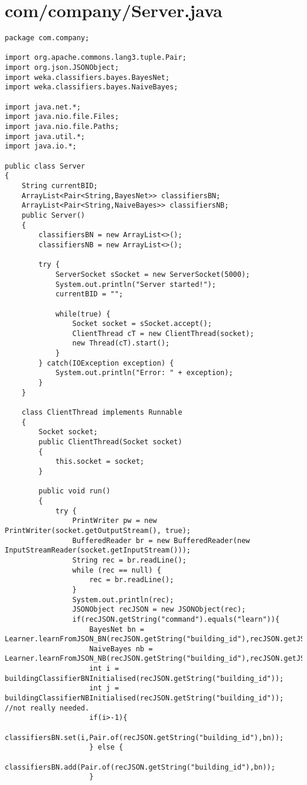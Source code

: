 \documentclass{article}
\begin{document}
\section{com/company/Server.java}
\begin{lstlisting}package com.company;

import org.apache.commons.lang3.tuple.Pair;
import org.json.JSONObject;
import weka.classifiers.bayes.BayesNet;
import weka.classifiers.bayes.NaiveBayes;

import java.net.*;
import java.nio.file.Files;
import java.nio.file.Paths;
import java.util.*;
import java.io.*;

public class Server
{
    String currentBID;
    ArrayList<Pair<String,BayesNet>> classifiersBN;
    ArrayList<Pair<String,NaiveBayes>> classifiersNB;
    public Server()
    {
        classifiersBN = new ArrayList<>();
        classifiersNB = new ArrayList<>();

        try {
            ServerSocket sSocket = new ServerSocket(5000);
            System.out.println("Server started!");
            currentBID = "";

            while(true) {
                Socket socket = sSocket.accept();
                ClientThread cT = new ClientThread(socket);
                new Thread(cT).start();
            }
        } catch(IOException exception) {
            System.out.println("Error: " + exception);
        }
    }

    class ClientThread implements Runnable
    {
        Socket socket;
        public ClientThread(Socket socket)
        {
            this.socket = socket;
        }

        public void run()
        {
            try {
                PrintWriter pw = new PrintWriter(socket.getOutputStream(), true);
                BufferedReader br = new BufferedReader(new InputStreamReader(socket.getInputStream()));
                String rec = br.readLine();
                while (rec == null) {
                    rec = br.readLine();
                }
                System.out.println(rec);
                JSONObject recJSON = new JSONObject(rec);
                if(recJSON.getString("command").equals("learn")){
                    BayesNet bn = Learner.learnFromJSON_BN(recJSON.getString("building_id"),recJSON.getJSONArray("learning_set"));
                    NaiveBayes nb = Learner.learnFromJSON_NB(recJSON.getString("building_id"),recJSON.getJSONArray("learning_set"));
                    int i = buildingClassifierBNInitialised(recJSON.getString("building_id"));
                    int j = buildingClassifierNBInitialised(recJSON.getString("building_id")); //not really needed.
                    if(i>-1){
                        classifiersBN.set(i,Pair.of(recJSON.getString("building_id"),bn));
                    } else {
                        classifiersBN.add(Pair.of(recJSON.getString("building_id"),bn));
                    }


\end{lstlisting}
\end{document}
